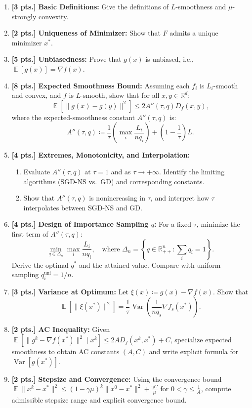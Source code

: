 \documentclass[11pt,a4paper]{article}
\DeclareMathOperator{\Var}{Var}
\DeclareMathOperator{\E}{\mathbb{E}}
\begin{document}
\begin{enumerate}[label=\textbf{\arabic*.}]
    \item \textbf{[3 pts.] Basic Definitions:} Give the definitions of $L$-smoothness and $\mu$-strongly convexity.
    \item \textbf{[2 pts.] Uniqueness of Minimizer:} Show that $F$ admits a unique minimizer $x^*$.
    \item \textbf{[5 pts.] Unbiasedness:} Prove that $g(x)$ is unbiased, i.e., $\E[g(x)] = \nabla f(x)$.
    \item \textbf{[8 pts.] Expected Smoothness Bound:} Assuming each $f_i$ is $L_i$-smooth and convex, and $f$ is $L$-smooth, show that for all $x, y \in \mathbb{R}^d$:
    \[
    \E \left[ \|g(x) - g(y)\|^2 \right] \le 2 A''(\tau, q) D_f(x, y),
    \]
    where the expected-smoothness constant $A''(\tau, q)$ is:
    \[
    A''(\tau, q) \coloneqq \frac{1}{\tau} \left( \max_i \frac{L_i}{n q_i} \right) + \left(1 - \frac{1}{\tau}\right) L.
    \]
    \item \textbf{[4 pts.] Extremes, Monotonicity, and Interpolation:}
    \begin{enumerate}[label=(\a*)]
        \item Evaluate $A''(\tau, q)$ at $\tau = 1$ and as $\tau \to +\infty$. Identify the limiting algorithms (SGD-NS vs.\ GD) and corresponding constants.
        \item Show that $A''(\tau, q)$ is nonincreasing in $\tau$, and interpret how $\tau$ interpolates between SGD-NS and GD.
    \end{enumerate}

    \item \textbf{[4 pts.] Design of Importance Sampling $q$:} For a fixed $\tau$, minimize the first term of $A''(\tau, q)$:
    \[
    \min_{q \in \Delta_n} \max_i \frac{L_i}{n q_i}, \quad \text{where } \Delta_n = \left\{ q \in \mathbb{R}_{++}^n : \sum_i q_i = 1 \right\}.
    \]
    Derive the optimal $q^*$ and the attained value. Compare with uniform sampling $q_i^{\text{uni}} = 1/n$.

    \item \textbf{[3 pts.] Variance at Optimum:} Let $\xi(x) \coloneqq g(x) - \nabla f(x)$. Show that
    \[
    \E \left[ \|\xi(x^*)\|^2 \right] = \frac{1}{\tau} \Var\left( \frac{1}{n q_s} \nabla f_s(x^*) \right).
    \]

    \item \textbf{[2 pts.] AC Inequality:} Given $\E \left[ \|g^k - \nabla f(x^*)\|^2 \mid x^k \right] \le 2A D_f(x^k, x^*) + C$, specialize expected smoothness to obtain AC constants $(A, C)$ and write explicit formula for $\Var[g(x^*)]$.

    \item \textbf{[2 pts.] Stepsize and Convergence:} Using the convergence bound $\E \|x^k - x^*\|^2 \le (1 - \gamma \mu)^k \|x^0 - x^*\|^2 + \frac{\gamma C}{\mu}$ for $0 < \gamma \le \frac{1}{A}$, compute admissible stepsize range and explicit convergence bound.
\end{enumerate}
\end{document}

